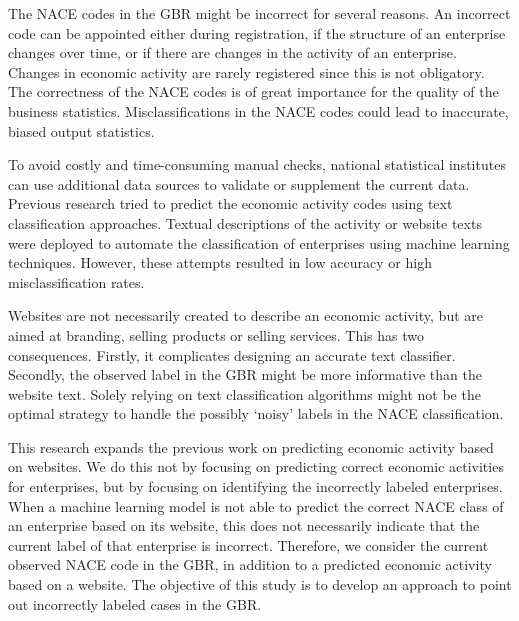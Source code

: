 \documentclass[12pt, a4paper, titlepage]{article}
\begin{document}
The NACE codes in the GBR might be incorrect for several reasons. An incorrect code can be appointed either during registration, if the structure of an enterprise changes over time, or if there are changes in the activity of an enterprise. Changes in economic activity are rarely registered \citep{Christensen2008, DeldenScholtusBurger} since this is not obligatory. The correctness of the NACE codes is of great importance for the quality of the business statistics. Misclassifications in the NACE codes could lead to inaccurate, biased output statistics.

To avoid costly and time-consuming manual checks, national statistical institutes can use additional data sources to validate or supplement the current data. Previous research tried to predict the economic activity codes using text classification approaches. Textual descriptions of the activity \citep{Caterini} or website texts \citep{Roelands, Berardi, Heidi} were deployed to automate the classification of enterprises using machine learning techniques. However, these attempts resulted in low accuracy or high misclassification rates. 

Websites are not necessarily created to describe an economic activity, but are aimed at branding, selling products or selling services. This has two consequences. Firstly, it complicates designing an accurate text classifier. Secondly, the observed label in the GBR might be more informative than the website text. Solely relying on text classification algorithms might not be the optimal strategy to handle the possibly ‘noisy’ labels in the NACE classification.

This research expands the previous work on predicting economic activity based on websites. We do this not by focusing on predicting correct economic activities for enterprises, but by focusing on identifying the incorrectly labeled enterprises. When a machine learning model is not able to predict the correct NACE class of an enterprise based on its website, this does not necessarily indicate that the current label of that enterprise is incorrect. Therefore, we consider the current observed NACE code in the GBR, in addition to a predicted economic activity based on a website. The objective of this study is to develop an approach to point out incorrectly labeled cases in the GBR.

\end{document}
